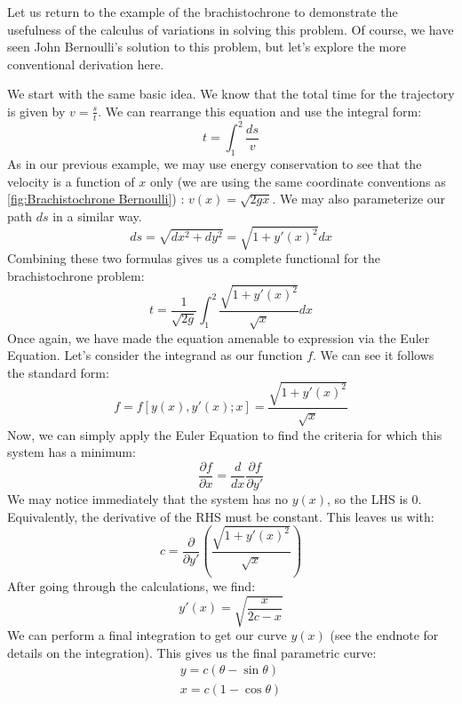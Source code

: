 \begin{example}[Brachistochrone]\label{ex:brachistrochrone}
    Let us return to the example of the \gls{brachistochrone} to demonstrate the usefulness of the calculus of variations in solving  this problem. Of course, we have seen John Bernoulli's solution to this problem, but let's explore the more conventional derivation here.

    We start with the same basic idea. We know that the total time for the trajectory is given by $v=\frac{s}{t}$. We can rearrange this equation and use the integral form:
    $$t=\int_1^2\frac{ds}{v}$$
    As in our previous example, we may use energy conservation to see that the velocity is a function of $x$ only (we are using the same coordinate conventions as \autoref{fig:Brachistochrone Bernoulli}) : $v(x)=\sqrt{2gx}$.  We may also parameterize our path $ds$ in a similar way. 
    \begin{equation}
        ds=\sqrt{dx^2+dy^2}=\sqrt{1+y'(x)^2}dx
    \end{equation}
    Combining these two formulas gives us a complete functional for the \gls{brachistochrone} problem:
    $$t=\frac{1}{\sqrt{2g}}\int_1^2\frac{\sqrt{1+y'(x)^2}}{\sqrt{x}}dx$$
    Once again, we have made the equation amenable to expression via the \gls{Euler Equation}. Let's consider the integrand as our function $f$. We can see it follows the standard form:
    $$f=f[y(x),y'(x);x]=\frac{\sqrt{1+y'(x)^2}}{\sqrt{x}}$$
    Now, we can simply apply the \gls{Euler Equation} to find the criteria for which this system has a minimum:
    $$\frac{\partial f}{\partial x}=\frac{d}{dx}\frac{\partial f}{\partial y'}$$
    We may notice immediately that the system has no $y(x)$, so the LHS is 0. Equivalently, the derivative of the RHS must be constant. This leaves us with:$$c=\frac{\partial}{\partial y'}\left(\frac{\sqrt{1+y'(x)^2}}{\sqrt{x}}\right)$$
    After going through the calculations, we find:$$y'(x)=\sqrt{\frac{x}{2c-x}}$$
    We can perform a final integration to get our curve $y(x)$ (see the endnote for details on the integration). This gives us the final parametric curve:
\begin{gather}
        y=c(\theta-\sin\theta)\\
        x=c(1-\cos\theta)
    \end{gather}
\end{example}


